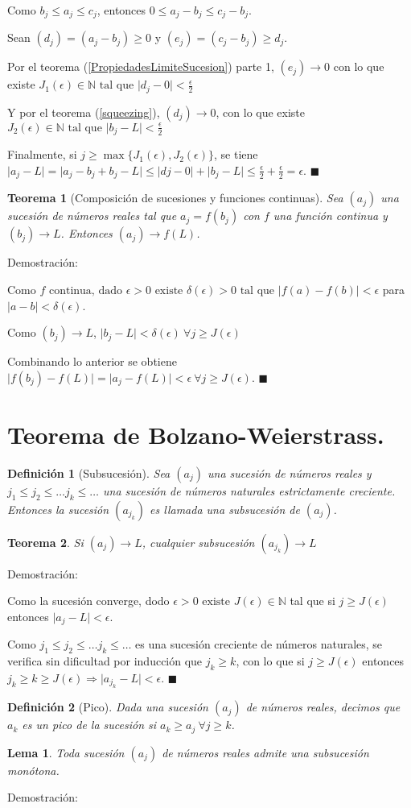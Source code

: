 \documentclass[12pt]{book}
\newcommand\N{{\mathbb N}}
\providecommand{\abs}[1]{\lvert#1\rvert}
\newtheorem{teo}{Teorema}[section]
\newtheorem{defi}{Definición}[section]
\newtheorem{lema}{Lema}[section]
\begin{document}
Como $b_j \le a_j \le c_j$, entonces $0 \le a_j-b_j \le c_j-b_j$.

Sean $(d_j)=(a_j-b_j) \ge 0$ y $(e_j)=(c_j-b_j) \ge d_j$.

Por el teorema (\ref{PropiedadesLimiteSucesion}) parte 1, $(e_j) \rightarrow 0$ con lo que existe $J_1(\epsilon) \in \N \mbox{ tal que } \abs{d_j-0}<\frac{\epsilon}{2}$

Y por el teorema (\ref{squeezing}), $(d_j) \rightarrow 0$, con lo que existe $J_2(\epsilon) \in \N \mbox{ tal que } \abs{b_j-L}<\frac{\epsilon}{2}$

Finalmente, si $j \ge \max\{J_1(\epsilon),J_2(\epsilon)\}$, se tiene  $\abs{a_j-L}=\abs{a_j-b_j+b_j-L} \le \abs{dj-0}+\abs{b_j-L} \le \frac{\epsilon}{2}+\frac{\epsilon}{2}=\epsilon$. $\blacksquare$
\begin{teo}[Composición de sucesiones y funciones continuas]\rm
Sea $(a_j)$ una sucesión de números reales tal que $a_j=f(b_j)$ con $f$ una función continua y $(b_j) \rightarrow L$. Entonces $(a_j) \rightarrow f(L)$.
\end{teo}
Demostración:

Como $f \mbox{ continua, dado }\epsilon>0 \mbox{ existe } \delta(\epsilon)>0 \mbox{ tal que } \abs{f(a)-f(b)}<\epsilon$ para $\abs{a-b}<\delta(\epsilon)$.

Como $(b_j) \rightarrow L$, $\abs{b_j-L}<\delta(\epsilon) \  \forall j \ge J(\epsilon)$

Combinando lo anterior se obtiene $\abs{f(b_j)-f(L)}=\abs{a_j-f(L)}<\epsilon \ \forall j \ge J(\epsilon)$. $\blacksquare$
\section{Teorema de Bolzano-Weierstrass.}
\begin{defi}[Subsucesión]\rm
Sea $(a_j)$ una sucesión de números reales y $j_1 \le j_2 \le \dots j_k \le \dots$ una sucesión de números naturales estrictamente creciente. Entonces la sucesión $(a_{j_k})$ es llamada una subsucesión de $(a_j)$.
\end{defi}
\begin{teo}\rm
Si $(a_j) \rightarrow L$, cualquier subsucesión $(a_{j_k}) \rightarrow L$
\end{teo}
Demostración:

Como la sucesión converge, dodo $\epsilon >0 \mbox{ existe } J(\epsilon) \in \N$ tal que si $j \ge J(\epsilon)$ entonces $\abs{a_j-L} < \epsilon$.

Como $j_1 \le j_2 \le \dots j_k \le \dots$ es una sucesión creciente de números naturales, se verifica sin dificultad por inducción que $j_k \ge k$, con lo que si $j \ge J(\epsilon)$ entonces $j_k \ge k \ge J(\epsilon) \Rightarrow \abs{a_{j_k}-L}<\epsilon$. $\blacksquare$
\begin{defi}[Pico]\rm
Dada una sucesión $(a_j)$ de números reales, decimos que $a_k$ es un pico de la sucesión si $a_k \ge a_j \ \forall{j \ge k}$.
\end{defi}
\begin{lema}\rm
Toda sucesión $(a_j)$ de números reales admite una subsucesión monótona.
\end{lema}
Demostración:
\end{document}
